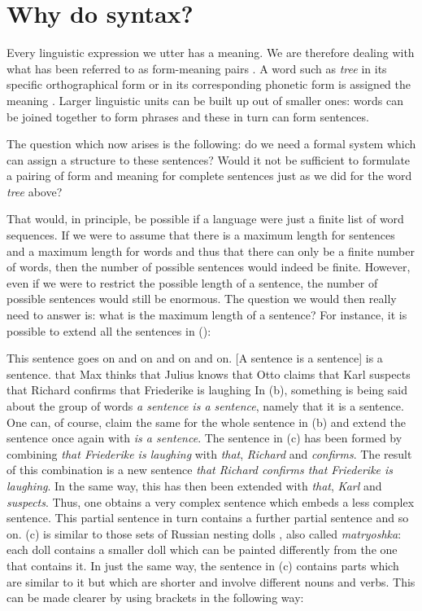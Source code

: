 \section{Why do syntax?}
\label{sec-wozu-syntax}

Every linguistic expression we utter has a meaning. We are therefore dealing with
what has been referred to as form-meaning pairs \citep{Saussure16a-En}. A word such as \emph{tree}
in its specific orthographical form or in its corresponding phonetic form is assigned the
meaning . Larger linguistic units can be built up out of smaller ones: words can be
joined together to form phrases and these in turn can form sentences. 

The question which now arises is the following: do we need a formal system which can assign a
structure to these sentences? Would it not be sufficient to formulate a pairing of form and meaning for complete sentences
just as we did for the word \emph{tree} above?  

That would, in principle, be possible if a language were just a finite list of word sequences.  If
we were to assume that there is a maximum length for sentences and a maximum length for words and
thus that there can only be a finite number of words, then the number of possible sentences would
indeed be finite.  However, even if we were to restrict the possible length of a sentence, the
number of possible sentences would still be enormous.  The question we would then really need
to answer is: what is the maximum length of a sentence?  For instance, it is possible to extend all
the sentences in (): 

\eal 
\ex This sentence goes on and on and on and on.
\ex {}[A sentence is a sentence] is a sentence.
\ex\label{einbettung-dass-Saetze}
that Max thinks that Julius knows that Otto claims that Karl suspects that Richard confirms that Friederike is laughing
\zl
In (b), something is being said about the group of words \emph{a sentence is a sentence},
namely that it is a sentence. One can, of course, claim the same for the whole sentence in
(b) and extend the sentence once again with \emph{is a sentence}. The sentence in (c)
has been formed by combining \emph{that Friederike is laughing} with \emph{that}, \emph{Richard} and \emph{confirms}. The result
of this combination is a new sentence \emph{that Richard confirms that Friederike is laughing}. In
the same way, this has then been extended with \emph{that}, \emph{Karl} and \emph{suspects}. 
Thus, one obtains a very complex sentence which embeds a less complex sentence. 
This partial sentence in turn contains a further partial sentence and so on.
(c) is similar to those sets of Russian nesting dolls%
, also called \emph{matryoshka}: each doll contains
a smaller doll which can be painted differently from the one that contains it. In just the same way,
the sentence in (c) contains parts which are similar to it but which are shorter and involve different nouns and verbs. This can be made clearer by using brackets in the following way: 

